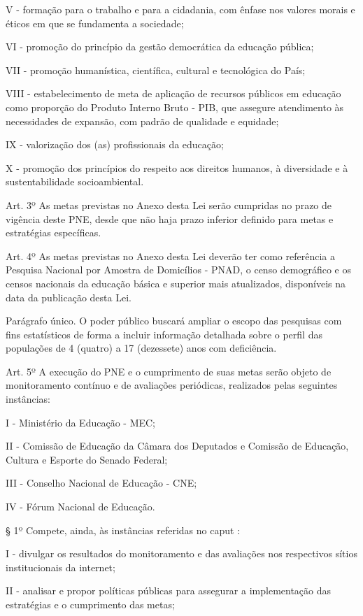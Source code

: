 \documentclass[
]{book}
\begin{document}
V - formação para o trabalho e para a cidadania, com ênfase nos valores morais e éticos em que se fundamenta a sociedade;

VI - promoção do princípio da gestão democrática da educação pública;

VII - promoção humanística, científica, cultural e tecnológica do País;

VIII - estabelecimento de meta de aplicação de recursos públicos em educação como proporção do Produto Interno Bruto - PIB, que assegure atendimento às necessidades de expansão, com padrão de qualidade e equidade;

IX - valorização dos (as) profissionais da educação;

X - promoção dos princípios do respeito aos direitos humanos, à diversidade e à sustentabilidade socioambiental.

Art. 3º As metas previstas no Anexo desta Lei serão cumpridas no prazo de vigência deste PNE, desde que não haja prazo inferior definido para metas e estratégias específicas.

Art. 4º As metas previstas no Anexo desta Lei deverão ter como referência a Pesquisa Nacional por Amostra de Domicílios - PNAD, o censo demográfico e os censos nacionais da educação básica e superior mais atualizados, disponíveis na data da publicação desta Lei.

Parágrafo único. O poder público buscará ampliar o escopo das pesquisas com fins estatísticos de forma a incluir informação detalhada sobre o perfil das populações de 4 (quatro) a 17 (dezessete) anos com deficiência.

Art. 5º A execução do PNE e o cumprimento de suas metas serão objeto de monitoramento contínuo e de avaliações periódicas, realizados pelas seguintes instâncias:

I - Ministério da Educação - MEC;

II - Comissão de Educação da Câmara dos Deputados e Comissão de Educação, Cultura e Esporte do Senado Federal;

III - Conselho Nacional de Educação - CNE;

IV - Fórum Nacional de Educação.

§ 1º Compete, ainda, às instâncias referidas no caput :

I - divulgar os resultados do monitoramento e das avaliações nos respectivos sítios institucionais da internet;

II - analisar e propor políticas públicas para assegurar a implementação das estratégias e o cumprimento das metas;
\end{document}
